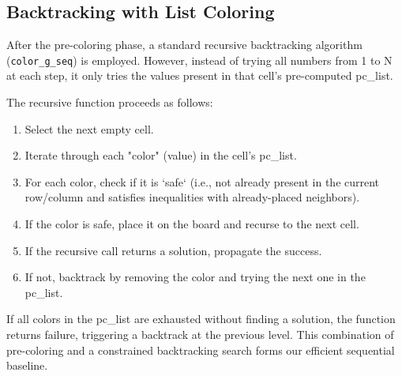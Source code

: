 \subsection{Backtracking with List Coloring}
After the pre-coloring phase, a standard recursive backtracking algorithm (\texttt{color\_g\_seq}) is employed. However, instead of trying all numbers from 1 to N at each step, it only tries the values present in that cell's pre-computed pc\_list. 

The recursive function proceeds as follows:
\begin{enumerate}
    \item Select the next empty cell.
    \item Iterate through each "color" (value) in the cell's pc\_list.
    \item For each color, check if it is `safe` (i.e., not already present in the current row/column and satisfies inequalities with already-placed neighbors).
    \item If the color is safe, place it on the board and recurse to the next cell.
    \item If the recursive call returns a solution, propagate the success.
    \item If not, backtrack by removing the color and trying the next one in the pc\_list.
\end{enumerate}
If all colors in the pc\_list are exhausted without finding a solution, the function returns failure, triggering a backtrack at the previous level. This combination of pre-coloring and a constrained backtracking search forms our efficient sequential baseline.